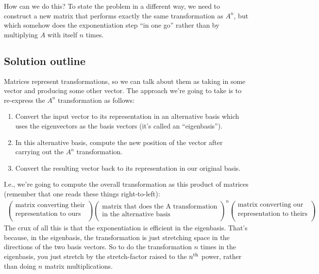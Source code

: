 How can we do this? To state the problem in a different way, we need to
construct a new matrix that performs exactly the same transformation as $A^n$,
but which somehow does the exponentiation step ``in one go'' rather than by
multiplying $A$ with itself $n$ times.

\subsection*{Solution outline}

Matrices represent transformations, so we can talk about them as taking in some
vector and producing some other vector. The approach we're going to take is to
re-express the $A^n$ transformation as follows:

\begin{enumerate}
\item Convert the input vector to its representation in an alternative basis which uses the
  eigenvectors as the basis vectors (it's called an ``eigenbasis'').
\item In this alternative basis, compute the new position of the vector after carrying out the
  $A^n$ transformation.
\item Convert the resulting vector back to its representation in our original basis.
\end{enumerate}

I.e., we're going to compute the overall transformation as this product of
matrices (remember that one reads these things right-to-left):
\begin{align*}
  \begin{pmatrix}\text{matrix converting their}\\\text{representation to ours} \\ \end{pmatrix}
  \begin{pmatrix}\text{matrix that does the A transformation}\\\text{in the alternative basis} \\ \end{pmatrix}^n
  \begin{pmatrix}\text{matrix converting our}\\\text{representation to theirs} \\ \end{pmatrix}
\end{align*}
The crux of all this is that the exponentiation is efficient in the
eigenbasis. That's because, in the eigenbasis, the transformation is just
stretching space in the directions of the two basis vectors. So to do the
transformation $n$ times in the eigenbasis, you just stretch by the
stretch-factor raised to the $n^{\text{th}}$ power, rather than doing $n$ matrix
multiplications.

